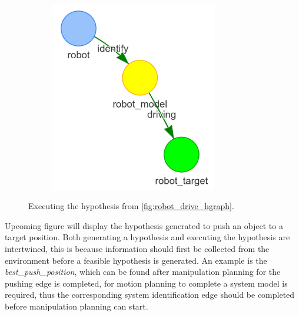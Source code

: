 \begin{figure}[H]
\begin{subfigure}{.3\textwidth}
    \caption{}%
    \end{subfigure}
    \begin{subfigure}{.3\textwidth}
    \centering
    \includegraphics[width=0.8\textwidth]{figures/connecting_nodes/robot_to_target/execute_robot_to_target_3}
    \caption{}%
    \end{subfigure}
    \caption{Executing the hypothesis from \cref{fig:robot_drive_hgraph}.}
    \label{fig:execute_robot_to_target}
\end{figure}

Upcoming figure will display the hypothesis generated to push an object to a target position. Both generating a hypothesis and executing the hypothesis are intertwined, this is because information should first be collected from the environment before a feasible hypothesis is generated. An example is the \textit{best\_push\_position}, which can be found after manipulation planning for the pushing edge is completed, for motion planning to complete a system model is required, thus the corresponding system identification edge should be completed before manipulation planning can start. 

